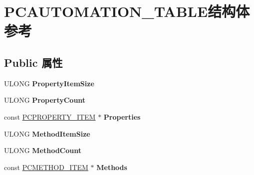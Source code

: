 \hypertarget{struct_p_c_a_u_t_o_m_a_t_i_o_n___t_a_b_l_e}{}\section{P\+C\+A\+U\+T\+O\+M\+A\+T\+I\+O\+N\+\_\+\+T\+A\+B\+L\+E结构体 参考}
\label{struct_p_c_a_u_t_o_m_a_t_i_o_n___t_a_b_l_e}
\subsection*{Public 属性}
\begin{DoxyCompactItemize}
\item 
\mbox{\label{struct_p_c_a_u_t_o_m_a_t_i_o_n___t_a_b_l_e_a16c490f3d4a6a4c146fc53eeb84bcb98}} 
U\+L\+O\+NG {\bfseries Property\+Item\+Size}
\item 
\mbox{\label{struct_p_c_a_u_t_o_m_a_t_i_o_n___t_a_b_l_e_af3e4de59680722b59283a64325556297}} 
U\+L\+O\+NG {\bfseries Property\+Count}
\item 
\mbox{\label{struct_p_c_a_u_t_o_m_a_t_i_o_n___t_a_b_l_e_a0af6b1fe6385f6883860b8a9ccb7688d}} 
const \hyperlink{struct_p_c_p_r_o_p_e_r_t_y___i_t_e_m}{P\+C\+P\+R\+O\+P\+E\+R\+T\+Y\+\_\+\+I\+T\+EM} $\ast$ {\bfseries Properties}
\item 
\mbox{\label{struct_p_c_a_u_t_o_m_a_t_i_o_n___t_a_b_l_e_aff6c5323d1c0210fd12bbc796b45853d}} 
U\+L\+O\+NG {\bfseries Method\+Item\+Size}
\item 
\mbox{\label{struct_p_c_a_u_t_o_m_a_t_i_o_n___t_a_b_l_e_a08a8289436ab605089f82c47481a3e16}} 
U\+L\+O\+NG {\bfseries Method\+Count}
\item 
\mbox{\label{struct_p_c_a_u_t_o_m_a_t_i_o_n___t_a_b_l_e_abad4445ca63376ebdbcf4d5065ce2502}} 
const \hyperlink{struct___p_c_m_e_t_h_o_d___i_t_e_m}{P\+C\+M\+E\+T\+H\+O\+D\+\_\+\+I\+T\+EM} $\ast$ {\bfseries Methods}
\item 
\mbox{\label{struct_p_c_a_u_t_o_m_a_t_i_o_n___t_a_b_l_e_a189e8b4cac77739a46d51d870e60678e}} 

\end{DoxyCompactItemize}
